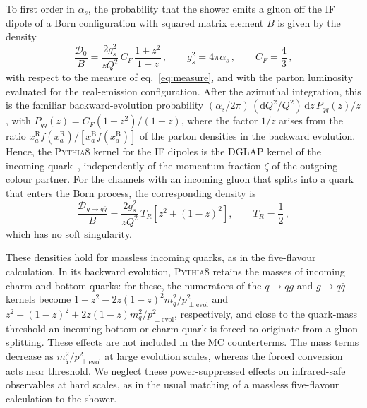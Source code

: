 \documentclass[a4paper,11pt]{article}
\newcommand{\as}{\alpha_s}
\newcommand{\dd}{\mathrm{d}}
\newcommand{\pythia}{\textsc{Pythia8}\xspace}
\newcommand{\Dens}{\mathcal{D}}
\begin{document}
To first order in $\as$, the probability that the shower emits a gluon
off the IF dipole of a Born configuration with squared matrix element
$B$ is given by the density
\begin{equation}
  \frac{\Dens_0}{B}=\frac{2g_s^2}{zQ^2}\,C_F\,\frac{1+z^2}{1-z}\,,
  \qquad g_s^2=4\pi\as\,,\qquad C_F=\frac{4}{3}\,,
  \label{eq:stockdensity}
\end{equation}
with respect to the measure of eq.~\eqref{eq:measure}, and with the
parton luminosity evaluated for the real-emission configuration. After
the azimuthal integration, this is the familiar backward-evolution
probability $(\as/2\pi)\,(\dd Q^2/Q^2)\,\dd z\,P_{qq}(z)/z$, with
$P_{qq}(z)=C_F(1+z^2)/(1-z)$, where the factor $1/z$ arises from the
ratio $x_a^{\mathrm{R}}f(x_a^{\mathrm{R}})/[x_a^{\mathrm{B}}f(x_a^{\mathrm{B}})]$
of the parton densities in the backward evolution. Hence, the \pythia kernel
for the IF dipoles is the DGLAP kernel of the incoming
quark~\cite{Cabouat:2017rzi}, independently of the momentum fraction
$\zeta$ of the outgoing colour partner. For the channels with an
incoming gluon that splits into a quark that enters the Born process,
the corresponding density is
\begin{equation}
  \frac{\Dens_{g\to q\bar q}}{B}=\frac{2g_s^2}{zQ^2}\,T_R\left[z^2+(1-z)^2\right],
  \qquad T_R=\frac{1}{2}\,,
  \label{eq:gqqdensity}
\end{equation}
which has no soft singularity.

These densities hold for massless incoming quarks, as in the
five-flavour calculation. In its backward evolution, \pythia retains
the masses of incoming charm and bottom quarks: for these, the
numerators of the $q\to qg$ and $g\to q\bar q$ kernels become
$1+z^2-2z(1-z)^2m_q^2/p_{\perp\mathrm{evol}}^2$ and
$z^2+(1-z)^2+2z(1-z)m_q^2/p_{\perp\mathrm{evol}}^2$, respectively, and
close to the quark-mass threshold an incoming bottom or charm quark is
forced to originate from a gluon splitting. These effects are not
included in the MC counterterms. The mass terms decrease as
$m_q^2/p_{\perp\mathrm{evol}}^2$ at large evolution scales, whereas
the forced conversion acts near threshold. We neglect these
power-suppressed effects on infrared-safe observables at hard scales,
as in the usual matching of a massless five-flavour calculation to
the shower.
\end{document}
